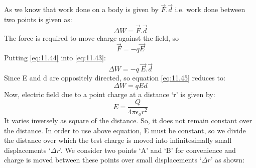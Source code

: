 As we know that work done on a
body is given by $\vec{F}.\vec{d}$ i.e. work done between two points is given as:
\begin{equation}\label{eq:11.43}
  \Delta W = \vec{F} . \vec{d} 
\end{equation}
The force is required to move charge against the field, so
\begin{equation} \label{eq:11.44}
  \vec{F} = - q\vec{E}
\end{equation}
Putting \ref{eq:11.44} into \ref{eq:11.43}:
\begin{equation}\label{eq:11.45}
  \Delta W = -q\:\vec{E} . \vec{d} 
\end{equation}
Since E and d are oppositely directed, so equation \ref{eq:11.45} reduces to:
\begin{equation}\label{eq:11.46}
  \Delta W = qEd 
\end{equation}
Now, electric field due to a point charge at a distance ‘r’ is given by:
\begin{equation}\label{eq:11.47}
  E = \frac{Q}{4\pi\epsilon_{o} r^{2}}
\end{equation}
It varies inversely as square of the distance.
So, it does not remain constant over the distance. In order to use above equation,
E must be constant, so we divide the distance over which the test
charge is moved into infinitesimally small displacements ‘$\Delta r$'.
We consider two points ‘A’ and ‘B’ for convenience and charge is
moved between these points over small displacements ‘$\Delta r$' as shown:

